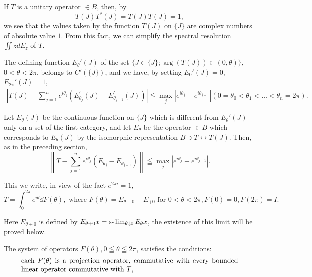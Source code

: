 \label{sec:XI.4}

If $T$ is a unitary operator $\in B$, then, by 
\begin{equation}\label{eq:XI.4.1}
T (J) T ^{*} (J) = T (J) \overline {{T (J)}} = 1,
\end{equation}
we see that the values taken by the function $T(J)$ on $\{J\}$ are complex numbers of absolute value $1$. From this fact, we can simplify the spectral resolution $\iint z dE_z$ of $T$. 

The defining function $E_{\theta}'(J)$ of the set $\{J \in \{J\}; \arg(T(J)) \in (0, \theta)\}$, $0 < \theta < 2\pi$, belongs to $C'(\{J\})$, and we have, by setting $E_0'(J) = 0$, $E_{2\pi}'(J) = 1$, 
\[
\begin{gathered}
\left| T (J) - \sum\limits_{j=1} ^{n} e ^ {i \theta_{j}} (E _ {\theta_{j}} ^{\prime} (J) - E _ {\theta_{j-1}} ^{\prime} (J)) \right| \leqq \max\limits _{j} \left| e ^ {i \theta_{j}} - e ^ {i \theta_{j-1}} \right| (0 = \theta_{0} < \theta_{1} < \dots < \theta_{n} = 2 \pi).
\end{gathered}
\]

Let $E_{\theta}(J)$ be the continuous function on $\{J\}$ which is different from $E_{\theta}'(J)$ only on a set of the first category, and let $E_{\theta}$ be the operator $\in B$ which corresponds to $E_{\theta}(J)$ by the isomorphic representation $B \ni T \leftrightarrow T(J)$. Then, as in the preceding section, 
\[
\left\| T - \sum\limits_{j=1} ^ {\dot {n}} e ^ {i \theta_{j}} (E _ {\theta_{j}} - E _ {\theta_{j-1}}) \right\| \leqq \max\limits _{j} \left| e ^ {i \theta_{j}} - e ^ {i \theta_{j-1}} \right|.
\]

This we write, in view of the fact $e^{2\pi i} = 1$, 
\begin{equation}T = \int_{0} ^{2 \pi} e ^{i \theta} \dd F (\theta), \text{ where } F (\theta) = E _{\theta +0} - E _{+0} \text{ for } 0 < \theta < 2 \pi , F (0) = 0, F (2 \pi) = I. \label{eq:XI.4.2}\end{equation}

Here $E_{\theta +0}$ is defined by $E_{\theta +0}x = \text{s-}\lim\nolimits_{\theta \downarrow 0} E_{\theta}x$, the existence of this limit will be proved below. 

\begin{theorem}\label{thm:XI.4.Theorem.1} The system of operators $F(\theta), 0 \leqq \theta \leqq 2\pi$, satisfies the conditions: 
\begin{equation}\label{eq:XI.4.3}
\parbox{0.90\linewidth}{each $F(\theta)$ is a projection operator, commutative with every bounded linear operator commutative with $T$,}
\end{equation}
\end{theorem}

